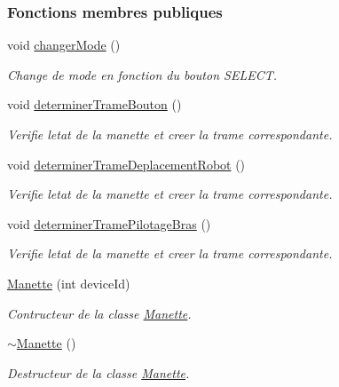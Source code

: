 \subsubsection*{Fonctions membres publiques}
\begin{DoxyCompactItemize}
\item 
void \hyperlink{class_manette_a202faf093876b9e95cfc316b552c59c3}{changer\+Mode} ()
\begin{DoxyCompactList}\small\item\em Change de mode en fonction du bouton S\+E\+L\+E\+CT. \end{DoxyCompactList}\item 
void \hyperlink{class_manette_a3fb9d1245400b6bb6379fbb63a8099ba}{determiner\+Trame\+Bouton} ()
\begin{DoxyCompactList}\small\item\em Verifie l\textquotesingle{}etat de la manette et creer la trame correspondante. \end{DoxyCompactList}\item 
void \hyperlink{class_manette_a97a50caac68954a229c7e9461e7f4232}{determiner\+Trame\+Deplacement\+Robot} ()
\begin{DoxyCompactList}\small\item\em Verifie l\textquotesingle{}etat de la manette et creer la trame correspondante. \end{DoxyCompactList}\item 
void \hyperlink{class_manette_ab5eb6972f366aa7527b2b27da5539638}{determiner\+Trame\+Pilotage\+Bras} ()
\begin{DoxyCompactList}\small\item\em Verifie l\textquotesingle{}etat de la manette et creer la trame correspondante. \end{DoxyCompactList}\item 
\hyperlink{class_manette_aaeb630a14bd4905666146dca3253827b}{Manette} (int device\+Id)
\begin{DoxyCompactList}\small\item\em Contructeur de la classe \hyperlink{class_manette}{Manette}. \end{DoxyCompactList}\item 
\hyperlink{class_manette_a86a0cab49599b27d86c2e77f13fa54a2}{$\sim$\+Manette} ()
\begin{DoxyCompactList}\small\item\em Destructeur de la classe \hyperlink{class_manette}{Manette}. \end{DoxyCompactList}\end{DoxyCompactItemize}
